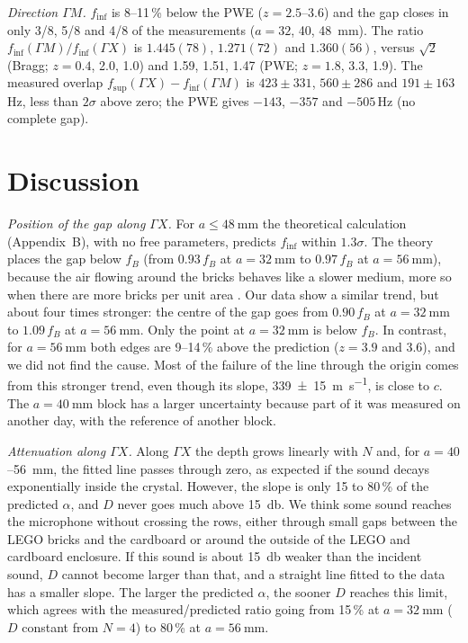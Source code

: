 \documentclass[9pt,a4paper,twocolumn]{extarticle}
\newcommand{\umm}{\milli\metre}
\newcommand{\udB}{\decibel}
\newcommand{\ums}{\metre\per\second}
\newcommand{\GX}{\ensuremath{\Gamma X}}
\newcommand{\GM}{\ensuremath{\Gamma M}}
\newcommand{\finf}{\ensuremath{f_{\mathrm{inf}}}}
\newcommand{\fsup}{\ensuremath{f_{\mathrm{sup}}}}
\begin{document}
\emph{Direction \GM.} \finf{} is 8--11\,\% below the PWE ($z=2.5$--$3.6$) and the gap closes in only 3/8, 5/8 and 4/8 of the measurements ($a=32$, 40, \SI{48}{\umm}). The ratio $\finf(\GM)/\finf(\GX)$ is $1.445(78)$, $1.271(72)$ and $1.360(56)$, versus $\sqrt2$ (Bragg; $z=0.4$, 2.0, 1.0) and 1.59, 1.51, 1.47 (PWE; $z=1.8$, 3.3, 1.9). The measured overlap $\fsup(\GX)-\finf(\GM)$ is $423\pm331$, $560\pm286$ and $191\pm163$\,Hz, less than $2\sigma$ above zero; the PWE gives $-143$, $-357$ and $-505$\,Hz (no complete gap).

\section{Discussion}
\emph{Position of the gap along \GX.} For $a\le\SI{48}{\umm}$ the theoretical calculation (Appendix~B), with no free parameters, predicts \finf{} within $1.3\sigma$. The theory places the gap below $f_B$ (from $0.93\,f_B$ at $a=\SI{32}{\umm}$ to $0.97\,f_B$ at $a=\SI{56}{\umm}$), because the air flowing around the bricks behaves like a slower medium, more so when there are more bricks per unit area \cite{krokhin}. Our data show a similar trend, but about four times stronger: the centre of the gap goes from $0.90\,f_B$ at $a=\SI{32}{\umm}$ to $1.09\,f_B$ at $a=\SI{56}{\umm}$. Only the point at $a=\SI{32}{\umm}$ is below $f_B$. In contrast, for $a=\SI{56}{\umm}$ both edges are 9--14\,\% above the prediction ($z=3.9$ and 3.6), and we did not find the cause. Most of the failure of the line through the origin comes from this stronger trend, even though its slope, \SI{339\pm15}{\ums}, is close to $c$. The $a=\SI{40}{\umm}$ block has a larger uncertainty because part of it was measured on another day, with the reference of another block.

\emph{Attenuation along \GX.} Along \GX{} the depth grows linearly with $N$ and, for $a=40$--\SI{56}{\umm}, the fitted line passes through zero, as expected if the sound decays exponentially inside the crystal. However, the slope is only 15 to 80\,\% of the predicted $\alpha$, and $D$ never goes much above \SI{15}{\udB}. We think some sound reaches the microphone without crossing the rows, either through small gaps between the LEGO bricks and the cardboard or around the outside of the LEGO and cardboard enclosure. If this sound is about \SI{15}{\udB} weaker than the incident sound, $D$ cannot become larger than that, and a straight line fitted to the data has a smaller slope. The larger the predicted $\alpha$, the sooner $D$ reaches this limit, which agrees with the measured/predicted ratio going from 15\,\% at $a=\SI{32}{\umm}$ ($D$ constant from $N=4$) to 80\,\% at $a=\SI{56}{\umm}$.
\end{document}
